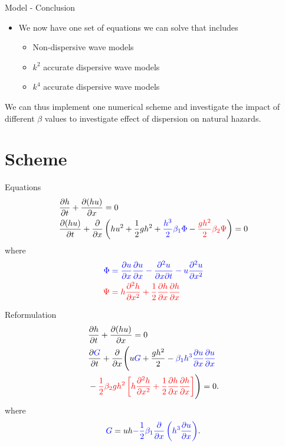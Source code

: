 \documentclass[pdf]{beamer}
\begin{document}
\begin{frame}{Model - Conclusion}
\begin{itemize}
	\item We now have one set of equations we can solve that includes
	\begin{itemize}
		\item Non-dispersive wave models
		\item $k^2$ accurate dispersive wave models
		\item $k^4$ accurate dispersive wave models
	\end{itemize}
\end{itemize}
We can thus implement one numerical scheme and investigate the impact of different $\beta$ values to investigate effect of dispersion on natural hazards. 
\end{frame}


\section{Scheme}
\begin{frame}{Equations}
\begin{align*}
&\dfrac{\partial h}{\partial t} + \dfrac{\partial (hu)}{\partial x} = 0\\
&\dfrac{\partial (hu)}{\partial t} + \dfrac{\partial }{\partial x} \left( hu^2 + \frac{1}{2}gh^2  +  {\color{blue} \frac{h^3}{2}\beta_1 \Phi } -   {\color{red} \frac{gh^2}{2} \beta_2 \Psi}  \right)= 0 \\
\end{align*}
where
\begin{align*}
\color{blue} \Phi  & \color{blue}= \frac{\partial u}{\partial x}\frac{\partial u}{\partial x} - \frac{\partial^2 u}{\partial x \partial t} - u\frac{\partial^2 u}{\partial x^2} \\
\color{red} \Psi & \color{red}= h \frac{\partial^2 h}{\partial x^2} + \frac{1}{2} \frac{\partial h}{\partial x}\frac{\partial h}{\partial x} 
\end{align*}
\end{frame}

\begin{frame}{Reformulation}
\begin{align*}
&\dfrac{\partial h}{\partial t} + \dfrac{\partial (hu)}{\partial x} = 0\\
&\dfrac{\partial {\color{blue} G} }{\partial t}  + \dfrac{\partial}{\partial x} \Bigg( u{\color{blue} G} + \dfrac{gh^2}{2} - {\color{blue} \beta_1 h^3\dfrac{\partial u}{\partial x}\dfrac{\partial u}{\partial x} } \\ &- {\color{red}\frac{1}{2} \beta_2 g h^2  \left[h\frac{\partial^2 h}{\partial x^2} +   \frac{1}{2}\frac{\partial h}{\partial x}\frac{\partial h}{\partial x}\right] } \Bigg) = 0.
\end{align*}
where
\begin{gather*}
{\color{blue} G} = uh {\color{blue} - \frac{1}{2} \beta_1\dfrac{\partial }{\partial x} \left ( h^3 \dfrac{\partial u}{\partial x} \right )}.
\end{gather*}
\end{frame}
\end{document}
